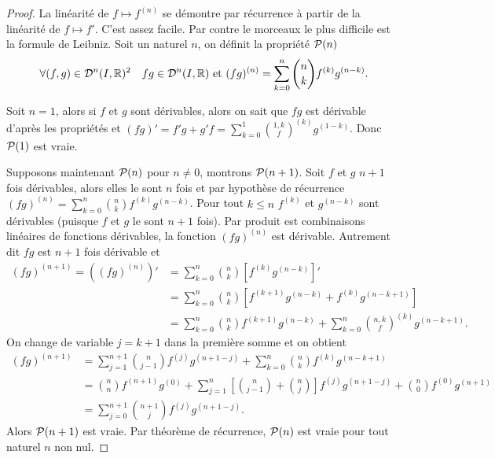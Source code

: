 \begin{proof}
  La linéarité de \(f \longmapsto f^{(n)}\) se démontre par récurrence à partir 
  de la linéarité de \(f \longmapsto f'\). C'est assez facile. Par contre le 
  morceaux le plus difficile est la formule de Leibniz. Soit un naturel \(n\), 
  on définit la propriété \(\P(n)\)
  \begin{equation}
    \forall (f,g) \in \derivnfois{n}{I}{\R}^2 \quad fg \in \derivnfois{n}{I}{\R} 
    \text{~et~} (fg)^{(n)}=\sum_{k=0}^n \binom{n}{k} f^{(k)}g^{(n-k)}.
  \end{equation}

  Soit \(n=1\), alors si \(f\) et \(g\) sont dérivables, alors on sait que 
  \(fg\) est dérivable d'après les propriétés et \((fg)'=f'g+g'f=\sum_{k=0}^1 
  \binom{1,k} f^{(k)}g^{(1-k)}\). Donc \(\P(1)\) est vraie.

  Supposons maintenant \(\P(n)\) pour \(n \neq 0\), montrons \(\P(n+1)\). Soit 
  \(f\) et \(g\) \(n+1\) fois dérivables, alors elles le sont \(n\) fois et par 
  hypothèse de récurrence \((fg)^{(n)}=\sum_{k=0}^n \binom{n}{k} 
  f^{(k)}g^{(n-k)}\). Pour tout \(k \leqslant n\) \(f^{(k)}\) et \(g^{(n-k)}\) 
  sont dérivables (puisque \(f\) et \(g\) le sont \(n+1\) fois). Par produit est 
  combinaisons linéaires de fonctions dérivables, la fonction \((fg)^{(n)}\) est 
  dérivable. Autrement dit \(fg\) est \(n+1\) fois dérivable et
  \begin{align}
    (fg)^{(n+1)}=\left((fg)^{(n)}\right)'&=\sum_{k=0}^n \binom{n}{k} 
    [f^{(k)}g^{(n-k)}]' \\
    &=\sum_{k=0}^n \binom{n}{k} [f^{(k+1)}g^{(n-k)}+f^{(k)}g^{(n-k+1)}]\\
    &=\sum_{k=0}^n \binom{n}{k} f^{(k+1)}g^{(n-k)} + \sum_{k=0}^n \binom{n,k} 
    f^{(k)}g^{(n-k+1)}.
  \end{align}
  On change de variable \(j=k+1\) dans la première somme et on obtient
  \begin{align}
    (fg)^{(n+1)}&=\sum_{j=1}^{n+1} \binom{n}{j-1} f^{(j)}g^{(n+1-j)} + 
    \sum_{k=0}^n \binom{n}{k} f^{(k)}g^{(n-k+1)}\\
    &= \binom{n}{n} f^{(n+1)}g^{(0)} + \sum_{j=1}^n 
    \left[\binom{n}{j-1}+\binom{n}{j}\right]f^{(j)}g^{(n+1-j)} + \binom{n}{0} 
    f^{(0)}g^{(n+1)}\\
    &= \sum_{j=0}^{n+1} \binom{n+1}{j}f^{(j)}g^{(n+1-j)}.
  \end{align}
  Alors \(\P(n+1)\) est vraie. Par théorème de récurrence, \(\P(n)\) est vraie 
  pour tout naturel \(n\) non nul.
\end{proof}

